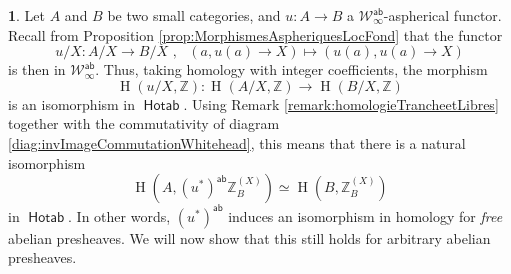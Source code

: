 \documentclass[10pt, english, a4paper, nothms]{amsart}
\theoremstyle{plain}
\theoremstyle{remark}
\theoremstyle{definition}
\newtheorem{paragr}[theorem]{}
\numberwithin{equation}{theorem}
\newcommand\Z{\mathbb{Z}}
\newcommand{\tranche}[2]{#1/{#2}}
\newcommand{\W}{\mathcal{W}}
\newcommand{\Hotab}{\operatorname{\mathsf{Hotab}}}
\newcommand{\ab}{{\mathsf{ab}}}
\newcommand{\Wh}[2]{\Z_{#1}^{\left(#2\right)}}
\renewcommand{\H}[2]{\operatorname{{H}}(#1,#2)}
\newcommand{\Wab}{\W^{\ab}}
\newcommand{\mdvirg}{\text{ ,}\hspace{10pt}}
\begin{document}
\begin{paragr}
Let $A$ and $B$ be two small categories, and $u : A \to B$ a
$\Wab_\infty$-aspherical functor. Recall from Proposition
\ref{prop:MorphismesAspheriquesLocFond} that the functor 
\[
\tranche{u}{X}:\tranche{A}{X}\to \tranche{B}{X} \mdvirg (a, u(a)\to X) \mapsto
(u(a),u(a)\to X)
\]
is then in $\Wab_\infty$. Thus, taking homology with integer coefficients, the morphism
\[
  \H{\tranche{u}{X}}{\Z} : \H{\tranche{A}{X}}{\Z} \to \H{\tranche{B}{X}}{\Z}
\]
is an isomorphism in $\Hotab$. Using Remark
\ref{remark:homologieTrancheetLibres} together with the commutativity of diagram
\ref{diag:invImageCommutationWhitehead}, this means that there is a natural
isomorphism 
\[
\H{A}{(u^*)^\ab\Wh{B}{X}} \simeq \H{B}{\Wh{B}{X}}
\]
in $\Hotab$. In other words, $(u^*)^\ab$ induces an isomorphism in homology for
\emph{free} abelian presheaves. We will now show that this still holds for
arbitrary abelian presheaves.
\end{paragr}
\end{document}
